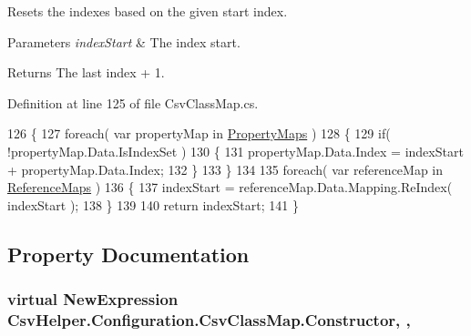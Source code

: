 Resets the indexes based on the given start index. 


\begin{DoxyParams}{Parameters}
{\em index\-Start} & The index start.\\
\hline
\end{DoxyParams}
\begin{DoxyReturn}{Returns}
The last index + 1.
\end{DoxyReturn}


Definition at line 125 of file Csv\-Class\-Map.\-cs.


\begin{DoxyCode}
126         \{
127             \textcolor{keywordflow}{foreach}( var propertyMap \textcolor{keywordflow}{in} \hyperlink{a00059_a9580e897abcba144f3101eb983348e25}{PropertyMaps} )
128             \{
129                 \textcolor{keywordflow}{if}( !propertyMap.Data.IsIndexSet )
130                 \{
131                     propertyMap.Data.Index = indexStart + propertyMap.Data.Index;
132                 \}
133             \}
134 
135             \textcolor{keywordflow}{foreach}( var referenceMap \textcolor{keywordflow}{in} \hyperlink{a00059_a6dfbf8f743b16d2ec83edef865ea2d9e}{ReferenceMaps} )
136             \{
137                 indexStart = referenceMap.Data.Mapping.ReIndex( indexStart );
138             \}
139 
140             \textcolor{keywordflow}{return} indexStart;
141         \}
\end{DoxyCode}


\subsection{Property Documentation}
\hypertarget{a00059_ae8038b36db7584ef1a73852fcc46404b}{
\subsubsection[{Constructor}]{\setlength{\rightskip}{0pt plus 5cm}virtual New\-Expression Csv\-Helper.\-Configuration.\-Csv\-Class\-Map.\-Constructor\hspace{0.3cm}{\ttfamily [get]}, {\ttfamily [set]}, {\ttfamily [inherited]}}}\label{a00059_ae8038b36db7584ef1a73852fcc46404b}


